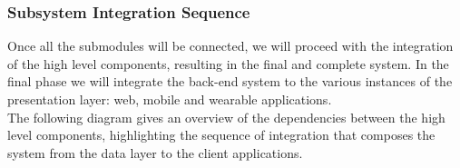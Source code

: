 \subsubsection{Subsystem Integration Sequence}
Once all the submodules will be connected, we will proceed with the integration of the high level components, resulting in the final and complete system.
In the final phase we will integrate the back-end system to the various instances of the presentation layer: web, mobile and wearable applications.\\
The following diagram gives an overview of the dependencies between the high level components, highlighting the sequence of integration that composes the system from the data layer to the client applications. 
\begin{figure}[H]
\end{figure}